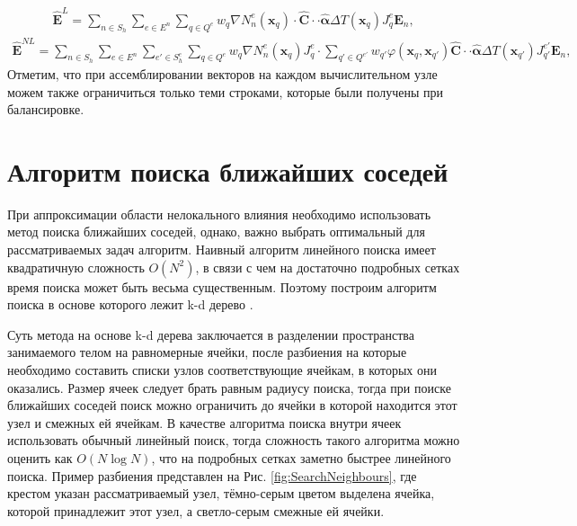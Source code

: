 \begin{gather*}
	\widehat{\textbf{E}}^L = 
	\sum\limits_{n \in S_h}
	\sum\limits_{e \in E^n}
	\sum\limits_{q \in Q^e}
	w_q \nabla N_n^e (\boldsymbol{x}_q) \cdot \widehat{\mathbf{C}} \cdot \cdot \widehat{\boldsymbol{\alpha}} \Delta T (\boldsymbol{x}_q) J_q^e \boldsymbol{E}_n,
\end{gather*}
\begin{gather*}
	\widehat{\textbf{E}}^{NL} = 
	\sum\limits_{n \in S_h}
	\sum\limits_{e \in E^n}
	\sum\limits_{e' \in S_h^e}
	\sum\limits_{q \in Q^e}
	w_q \nabla N_n^e (\boldsymbol{x}_q) J_q^e \cdot
	\sum\limits_{q' \in Q^{e'}}
	w_{q'} \varphi (\boldsymbol{x}_q, \boldsymbol{x}_{q'}) \widehat{\mathbf{C}} \cdot \cdot \widehat{\boldsymbol{\alpha}} \Delta T (\boldsymbol{x}_{q'}) J_{q'}^{e'} \boldsymbol{E}_n,
\end{gather*}
Отметим, что при ассемблировании векторов на каждом вычислительном узле можем также ограничиться только теми строками, которые были получены при балансировке.

\section{Алгоритм поиска ближайших соседей}\label{sec:ProgramComplex/SearchMeighbours}

При аппроксимации области нелокального влияния необходимо использовать метод поиска ближайших соседей, однако, важно выбрать оптимальный для рассматриваемых задач алгоритм. Наивный алгоритм линейного поиска имеет квадратичную сложность $O (N^2)$, в связи с чем на достаточно подробных сетках время поиска может быть весьма существенным. Поэтому построим алгоритм поиска в основе которого лежит k-d дерево \cite{kdtree}.

Суть метода на основе k-d дерева заключается в разделении пространства занимаемого телом на равномерные ячейки, после разбиения на которые необходимо составить списки узлов соответствующие ячейкам, в которых они оказались. Размер ячеек следует брать равным радиусу поиска, тогда при поиске ближайших соседей поиск можно ограничить до ячейки в которой находится этот узел и смежных ей ячейкам. В качестве алгоритма поиска внутри ячеек использовать обычный линейный поиск, тогда сложность такого алгоритма можно оценить как $O(N \log N)$, что на подробных сетках заметно быстрее линейного поиска. Пример разбиения представлен на Рис. \ref{fig:SearchNeighbours}, где крестом указан рассматриваемый узел, тёмно-серым цветом выделена ячейка, которой принадлежит этот узел, а светло-серым смежные ей ячейки.

